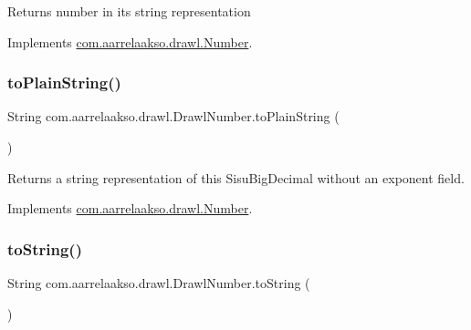 \begin{DoxyReturn}{Returns}
number in it\textquotesingle{}s string representation 
\end{DoxyReturn}


Implements \hyperlink{interfacecom_1_1aarrelaakso_1_1drawl_1_1_number_accc9efbfff1dfc0ff3d6352e3c1cfd4e}{com.\+aarrelaakso.\+drawl.\+Number}.

\mbox{\label{classcom_1_1aarrelaakso_1_1drawl_1_1_drawl_number_a07c4c1c3a0e81ae9aef3325bef3e0152}} 
\subsubsection{\texorpdfstring{to\+Plain\+String()}{toPlainString()}}
{\footnotesize\ttfamily String com.\+aarrelaakso.\+drawl.\+Drawl\+Number.\+to\+Plain\+String (\begin{DoxyParamCaption}{ }\end{DoxyParamCaption})}

\begin{DoxyReturn}{Returns}
a string representation of this Sisu\+Big\+Decimal without an exponent field. 
\end{DoxyReturn}


Implements \hyperlink{interfacecom_1_1aarrelaakso_1_1drawl_1_1_number_a0c6dd9fbd93fdb6d7e487f507d55ba43}{com.\+aarrelaakso.\+drawl.\+Number}.

\mbox{\label{classcom_1_1aarrelaakso_1_1drawl_1_1_drawl_number_a24775bf5217d477c4b39149596210184}} 
\subsubsection{\texorpdfstring{to\+String()}{toString()}}
{\footnotesize\ttfamily String com.\+aarrelaakso.\+drawl.\+Drawl\+Number.\+to\+String (\begin{DoxyParamCaption}{ }\end{DoxyParamCaption})}



